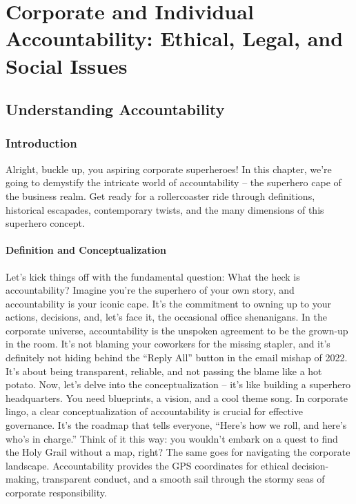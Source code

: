 \documentclass[
  letterpaper,
  DIV=11,
  numbers=noendperiod]{scrreprt}
\begin{document}

\chapter{Corporate and Individual Accountability: Ethical, Legal, and
Social
Issues}\label{corporate-and-individual-accountability-ethical-legal-and-social-issues}

\section{Understanding
Accountability}\label{understanding-accountability}

\subsection{Introduction}\label{introduction-2}

Alright, buckle up, you aspiring corporate superheroes! In this chapter,
we're going to demystify the intricate world of accountability -- the
superhero cape of the business realm. Get ready for a rollercoaster ride
through definitions, historical escapades, contemporary twists, and the
many dimensions of this superhero concept.

\subsubsection{Definition and
Conceptualization}\label{definition-and-conceptualization}

Let's kick things off with the fundamental question: What the heck is
accountability? Imagine you're the superhero of your own story, and
accountability is your iconic cape. It's the commitment to owning up to
your actions, decisions, and, let's face it, the occasional office
shenanigans. In the corporate universe, accountability is the unspoken
agreement to be the grown-up in the room. It's not blaming your
coworkers for the missing stapler, and it's definitely not hiding behind
the ``Reply All'' button in the email mishap of 2022. It's about being
transparent, reliable, and not passing the blame like a hot potato. Now,
let's delve into the conceptualization -- it's like building a superhero
headquarters. You need blueprints, a vision, and a cool theme song. In
corporate lingo, a clear conceptualization of accountability is crucial
for effective governance. It's the roadmap that tells everyone, ``Here's
how we roll, and here's who's in charge.'' Think of it this way: you
wouldn't embark on a quest to find the Holy Grail without a map, right?
The same goes for navigating the corporate landscape. Accountability
provides the GPS coordinates for ethical decision-making, transparent
conduct, and a smooth sail through the stormy seas of corporate
responsibility.
\end{document}
